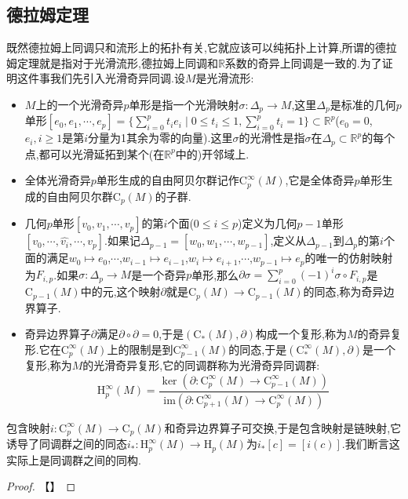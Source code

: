\subsection{德拉姆定理}

既然德拉姆上同调只和流形上的拓扑有关,它就应该可以纯拓扑上计算,所谓的德拉姆定理就是指对于光滑流形,德拉姆上同调和$\mathbb{R}$系数的奇异上同调是一致的.为了证明这件事我们先引入光滑奇异同调.设$M$是光滑流形:
\begin{itemize}
	\item $M$上的一个光滑奇异$p$单形是指一个光滑映射$\sigma:\Delta_p\to M$,这里$\Delta_p$是标准的几何$p$单形$[e_0,e_1,\cdots,e_p]=\{\sum_{i=0}^pt_ie_i\mid 0\le t_i\le1,\sum_{i=0}^pt_i=1\}\subset\mathbb{R}^p$($e_0=0$,$e_i,i\ge1$是第$i$分量为1其余为零的向量).这里$\sigma$的光滑性是指$\sigma$在$\Delta_p\subset\mathbb{R}^p$的每个点,都可以光滑延拓到某个(在$\mathbb{R}^p$中的)开邻域上.
	\item 全体光滑奇异$p$单形生成的自由阿贝尔群记作$\mathrm{C}_p^{\infty}(M)$,它是全体奇异$p$单形生成的自由阿贝尔群$\mathrm{C}_p(M)$的子群.
	\item 几何$p$单形$[v_0,v_1,\cdots,v_p]$的第$i$个面($0\le i\le p$)定义为几何$p-1$单形$[v_0,\cdots,\hat{v_i},\cdots,v_p]$.如果记$\Delta_{p-1}=[w_0,w_1,\cdots,w_{p-1}]$,定义从$\Delta_{p-1}$到$\Delta_p$的第$i$个面的满足$w_0\mapsto e_0$,$\cdots$,$w_{i-1}\mapsto e_{i-1}$,$w_i\mapsto e_{i+1}$,$\cdots$,$w_{p-1}\mapsto e_p$的唯一的仿射映射为$F_{i,p}$.如果$\sigma:\Delta_p\to M$是一个奇异$p$单形,那么$\partial\sigma=\sum_{i=0}^p(-1)^i\sigma\circ F_{i,p}$是$\mathrm{C}_{p-1}(M)$中的元,这个映射$\partial$就是$\mathrm{C}_p(M)\to\mathrm{C}_{p-1}(M)$的同态,称为奇异边界算子.
	\item 奇异边界算子$\partial$满足$\partial\circ\partial=0$,于是$(\mathrm{C}_*(M),\partial)$构成一个复形,称为$M$的奇异复形.它在$\mathrm{C}^{\infty}_p(M)$上的限制是到$\mathrm{C}^{\infty}_{p-1}(M)$的同态,于是$(\mathrm{C}_*^{\infty}(M),\partial)$是一个复形,称为$M$的光滑奇异复形,它的同调群称为光滑奇异同调群:
	$$\mathrm{H}_p^{\infty}(M)=\frac{\ker\left(\partial:\mathrm{C}_p^{\infty}(M)\to\mathrm{C}_{p-1}^{\infty}(M)\right)}{\mathrm{im}\left(\partial:\mathrm{C}_{p+1}^{\infty}(M)\to\mathrm{C}_p^{\infty}(M)\right)}$$
\end{itemize}

包含映射$i:\mathrm{C}_p^{\infty}(M)\to\mathrm{C}_p(M)$和奇异边界算子可交换,于是包含映射是链映射,它诱导了同调群之间的同态$i_*:\mathrm{H}_p^{\infty}(M)\to\mathrm{H}_p(M)$为$i_*[c]=[i(c)]$.我们断言这实际上是同调群之间的同构.
\begin{proof}
	
	【】
\end{proof}

